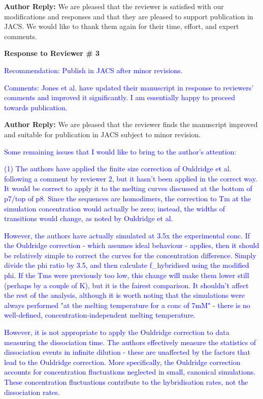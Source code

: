 \documentclass[11pt,a4paper]{letter} %
\begin{document}
\textbf{Author Reply:} We are pleased that the reviewer is satisfied with our modifications and responses and that they are pleased to support publication in JACS. We would like to thank them again for their time, effort, and expert comments.




\begin{shaded}
\textbf{Response to Reviewer \# 3}
\end{shaded}

\textcolor{blue}{Recommendation: Publish in JACS after minor revisions.
}

\textcolor{blue}{Comments: Jones et al. have updated their manuscript in response to reviewers' comments and improved it significantly. I am essentially happy to proceed towards publication.
}

\textbf{Author Reply:} We are pleased that the reviewer finds the manuscript improved and suitable for publication in JACS subject to minor revision.

\textcolor{blue}{
Some remaining issues that I would like to bring to the author's attention:
}

\textcolor{blue}{
(1) The authors have applied the finite size correction of Ouldridge et al. following a comment by reviewer 2, but it hasn't been applied in the correct way. It would be correct to apply it to the melting curves discussed at the bottom of p7/top of p8. Since the sequences are homodimers, the correction to Tm at the simulation concentration would actually be zero; instead, the widths of transitions would change, as noted by Ouldridge et al.
}

\textcolor{blue}{
However, the authors have actually simulated at 3.5x the experimental conc. If the Ouldridge correction - which assumes ideal behaviour - applies, then it should be relatively simple to correct the curves for the concentration difference. Simply divide the phi ratio by 3.5, and then calculate f\_hybridised using the modified phi. If the Tms were previously too low, this change will make them lower still (perhaps by a couple of K), but it is the fairest comparison. It shouldn't affect the rest of the analysis, although it is worth noting that the simulations were always performed "at the melting temperature for a conc of 7mM" - there is no well-defined, concentration-independent melting temperature.
}

\textcolor{blue}{
However, it is not appropriate to apply the Ouldridge correction to data measuring the dissociation time. The authors effectively measure the statistics of dissociation events in infinite dilution - these are unaffected by the factors that lead to the Ouldridge correction. More specifically, the Ouldridge correction accounts for concentration fluctuations neglected in small, canonical simulations. These concentration fluctuations contribute to the hybridisation rates, not the dissociation rates.
}
\end{document}
